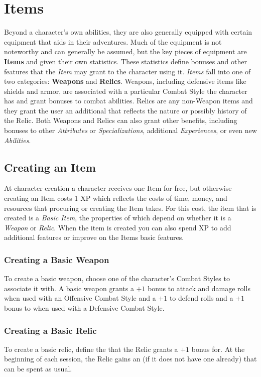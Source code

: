 \section{Items}\label{sec:items}
Beyond a character's own abilities, they are also generally equipped with certain equipment that aids in their adventures.
Much of the equipment is not noteworthy and can generally be assumed, but the key pieces of equipment are \textbf{Items} and given their own statistics.
These statistics define bonuses and other features that the \emph{Item} may grant to the character using it.
\emph{Items} fall into one of two categories: \textbf{Weapons} and \textbf{Relics}.
Weapons, including defensive items like shields and armor, are associated with a particular Combat Style the character has and grant bonuses to combat abilities.
Relics are any non-Weapon items and they grant the user an additional \Experience{} that reflects the nature or possibly history of the Relic.
Both Weapons and Relics can also grant other benefits, including bonuses to other \emph{Attributes} or \emph{Specializations}, additional \emph{Experiences}, or even new \emph{Abilities}.

\subsection{Creating an Item}
At character creation a character receives one Item for free, but otherwise creating an Item costs 1 XP which reflects the costs of time, money, and resources that procuring or creating the Item takes.
For this cost, the item that is created is a \emph{Basic Item}, the properties of which depend on whether it is a \emph{Weapon} or \emph{Relic}.
When the item is created you can also spend XP to add additional features or improve on the Items basic features.

\subsubsection{Creating a Basic Weapon}
To create a basic weapon, choose one of the character's Combat Styles to associate it with.
A basic weapon grants a $+1$ bonus to attack and damage rolls when used with an Offensive Combat Style and a $+1$ to defend rolls and a $+1$ bonus to \Block when used with a Defensive Combat Style.

\subsubsection{Creating a Basic Relic}
To create a basic relic, define the \Experience{} that the Relic grants a $+1$ bonus for.
At the beginning of each session, the Relic gains an \Advantage{} (if it does not have one already) that can be spent as usual.


